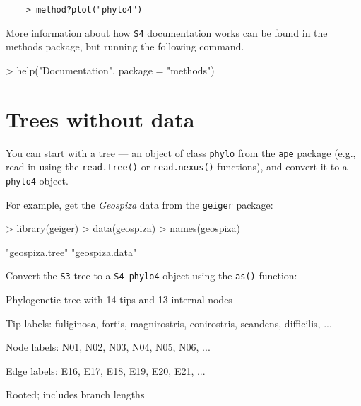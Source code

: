 \documentclass{article}
\newcommand{\code}[1]{{{\tt #1}}}
\begin{document}
\begin{verbatim}
	> method?plot("phylo4")
\end{verbatim}

More information about how \code{S4} documentation works can be found in the methods package, but running the following command.

\begin{Schunk}
\begin{Sinput}
> help("Documentation", package = "methods")
\end{Sinput}
\end{Schunk}

\section{Trees without data}

You can start with a tree --- an object of
class \code{phylo} from the \code{ape} package
(e.g., read in using the \code{read.tree()} or \code{read.nexus()}
functions), and convert it to a \code{phylo4} object.

For example, get the \emph{Geospiza} data from the \code{geiger} package:
\begin{Schunk}
\begin{Sinput}
> library(geiger)
> data(geospiza)
> names(geospiza)
\end{Sinput}
\begin{Soutput}
[1] "geospiza.tree" "geospiza.data"
\end{Soutput}
\end{Schunk}

Convert the \code{S3} tree to a \code{S4 phylo4} object using the \code{as()} function:
\begin{Schunk}
\begin{Soutput}
Phylogenetic tree with 14 tips and 13 internal nodes

Tip labels:
	fuliginosa, fortis, magnirostris, conirostris, scandens, difficilis, ...

Node labels:
	N01, N02, N03, N04, N05, N06, ...

Edge labels:
	E16, E17, E18, E19, E20, E21, ...

Rooted; includes branch lengths
\end{Soutput}
\end{Schunk}
\end{document}
